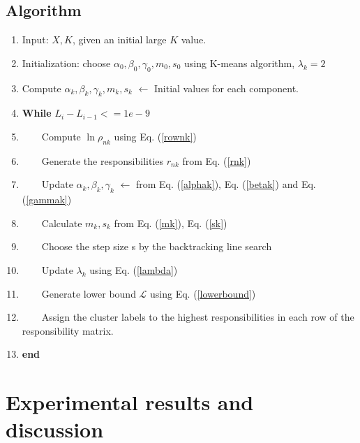 \documentclass[conference]{IEEEtran}
\begin{document}
\subsection*{\textbf{Algorithm}}
\begin{enumerate}
    \item Input: $X, K$, given an initial large $K$ value.
    \item Initialization: choose  $\alpha_0, \beta_0, \gamma_0, m_0, s_0 $ using K-means algorithm, $\lambda_k = 2$
    \item Compute $\alpha_k, \beta_k, \gamma_k, m_k, s_k$ $\leftarrow$ Initial values for each component.
    \item \textbf{While} $L_i - L_{i-1} <= 1e-9$ 
    \item $\quad\quad$Compute $\ln \rho_{nk}$ using Eq. (\ref{rownk})
    \item $\quad\quad$Generate the responsibilities $r_{nk}$ from Eq. (\ref{rnk})
    \item $\quad\quad$Update $\alpha_k, \beta_k, \gamma_k$ $\leftarrow$ from Eq. (\ref{alphak}), Eq. (\ref{betak}) and
    Eq. (\ref{gammak})
    \item $\quad\quad$Calculate $m_k, s_k$ from Eq. (\ref{mk}), Eq. (\ref{sk}) 
    \item $\quad\quad$Choose the step size s by the backtracking line search
    \item $\quad\quad$Update $\lambda_k$ using Eq. (\ref{lambda})
    \item $\quad\quad$Generate lower bound $\mathcal{L}$ using Eq. (\ref{lowerbound})
    \item $\quad\quad$Assign the cluster labels to the highest responsibilities in each row of the responsibility matrix.
    \item \textbf{end}
    
\end{enumerate}
\section{Experimental results and discussion}
\end{document}
